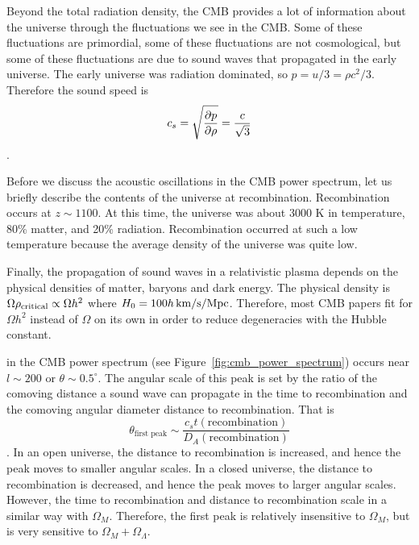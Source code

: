 Beyond the total radiation density, the CMB provides a lot of information about the universe
through the fluctuations we see in the CMB.  Some of these fluctuations are primordial, some of these fluctuations are not cosmological, but some of these fluctuations are due to sound waves that propagated in the early universe.
The early universe was radiation dominated, so $p = u/3 = \rho c^2/3$.  Therefore the sound
speed is
\begin{dmath}
    c_s = \sqrt{\frac{\partial p}{\partial\rho}} \nolinebreak
        = \frac{c}{\sqrt{3}}
\end{dmath}.

Before we discuss the acoustic oscillations in the CMB power spectrum, let us briefly describe
the contents of the universe at recombination.  Recombination occurs at $z\sim1100$.
At this time, the universe was about 3000 K in temperature, 80\% matter, and 20\% radiation.
Recombination occurred at such a low temperature because the average density of the universe
was quite low.

Finally, the propagation of sound waves in a relativistic plasma depends on the physical
densities of matter, baryons and dark energy.  The physical density is
$\Omega\rho_{\rm critical} \propto \Omega h^2$ where $H_0 = 100h\,{\rm km}/{\rm s}/{\rm Mpc}$.
Therefore, most CMB papers fit for $\Omega h^2$ instead of $\Omega$ on its own in order to
reduce degeneracies with the Hubble constant.

 in the CMB power spectrum (see Figure~\ref{fig:cmb_power_spectrum})
occurs near $l\sim200$ or $\theta\sim0.5^\circ$.  The angular scale of this peak is set by the
ratio of the comoving distance a sound wave can propagate in the time to recombination and
the comoving angular diameter distance to recombination.  That is
\begin{dmath}
    \theta_{\text{first peak}} \sim \frac{c_s t(\text{recombination})}{D_A(\text{recombination})}
\end{dmath}.
In an open universe, the distance to recombination is increased, and hence the peak moves to smaller
angular scales.  In a closed universe, the distance to recombination is decreased, and hence
the peak moves to larger angular scales.  However, the time to recombination and distance to
recombination scale in a similar way with $\Omega_M$.  Therefore, the first peak is relatively
insensitive to $\Omega_M$, but is very sensitive to $\Omega_M+\Omega_\Lambda$.

